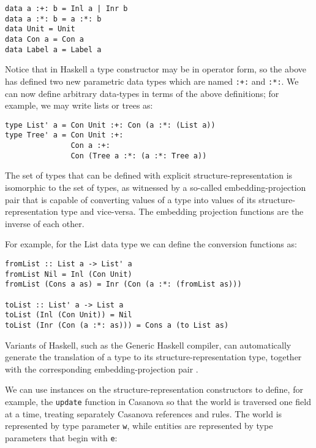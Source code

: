 \begin{lstlisting}
data a :+: b = Inl a | Inr b
data a :*: b = a :*: b
data Unit = Unit
data Con a = Con a
data Label a = Label a
\end{lstlisting}

Notice that in Haskell a type constructor may be in operator form, so the above has defined two new parametric data types which are named \texttt{:+:} and \texttt{:*:}. We can now define arbitrary data-types in terms of the above definitions; for example, we may write lists or trees as:

\begin{lstlisting}
type List' a = Con Unit :+: Con (a :*: (List a))
type Tree' a = Con Unit :+: 
               Con a :+: 
               Con (Tree a :*: (a :*: Tree a))
\end{lstlisting}

The set of types that can be defined with explicit structure-representation is isomorphic \cite{APPENDIX_E_STRUCTURE_REPRESENTATION} to the set of types, as witnessed by a so-called embedding-projection pair that is capable of converting values of a type into values of its structure-representation type and vice-versa. The embedding projection functions are the inverse of each other.

For example, for the List data type we can define the conversion functions as:

\begin{lstlisting}
fromList :: List a -> List' a
fromList Nil = Inl (Con Unit)
fromList (Cons a as) = Inr (Con (a :*: (fromList as)))

toList :: List' a -> List a
toList (Inl (Con Unit)) = Nil
toList (Inr (Con (a :*: as))) = Cons a (to List as)
\end{lstlisting}

Variants of Haskell, such as the Generic Haskell compiler, can automatically generate the translation of a type to its structure-representation type, together with the corresponding embedding-projection pair \cite{APPENDIX_E_GENERIC_HASKELL}.

We can use instances on the structure-representation constructors to define, for example, the \texttt{update} function in Casanova so that the world is traversed one field at a time, treating separately Casanova references and rules. The world is represented by type parameter \texttt{w}, while entities are represented by type parameters that begin with \texttt{e}:

